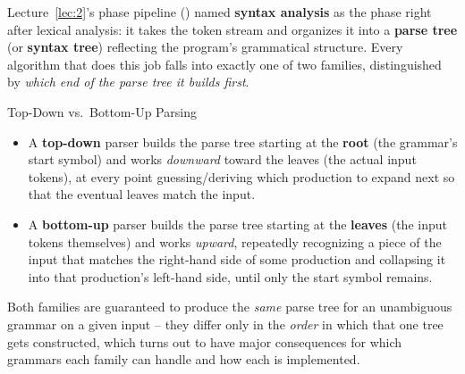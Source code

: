 \documentclass[full-course-notes.tex]{subfiles}
\begin{document}
\dbtag Lecture~\ref{lec:2}'s phase pipeline () named
\textbf{syntax analysis} as the phase right after lexical analysis: it takes the token stream
and organizes it into a \textbf{parse tree} (or \textbf{syntax tree}) reflecting the program's
grammatical structure. Every algorithm that does this job falls into exactly one of two
families, distinguished by \emph{which end of the parse tree it builds first}.

\begin{defbox}{Top-Down vs.\ Bottom-Up Parsing}
\begin{itemize}
  \item A \textbf{top-down} parser builds the parse tree starting at the \textbf{root} (the
  grammar's start symbol) and works \emph{downward} toward the leaves (the actual input
  tokens), at every point guessing/deriving which production to expand next so that the
  eventual leaves match the input.
  \item A \textbf{bottom-up} parser builds the parse tree starting at the \textbf{leaves} (the
  input tokens themselves) and works \emph{upward}, repeatedly recognizing a piece of the input
  that matches the right-hand side of some production and collapsing it into that production's
  left-hand side, until only the start symbol remains.
\end{itemize}
Both families are guaranteed to produce the \emph{same} parse tree for an unambiguous grammar
on a given input -- they differ only in the \emph{order} in which that one tree gets
constructed, which turns out to have major consequences for which grammars each family can
handle and how each is implemented.
\end{defbox}
\end{document}
